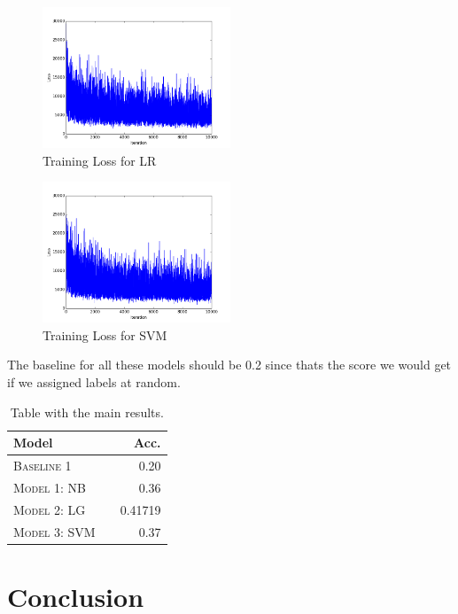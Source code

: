 \documentclass[11pt]{article}
\begin{document}
\begin{figure}
  \centering
  \includegraphics[width=0.5\textwidth]{lossLR}
  \caption{\label{fig:lLR} Training Loss for LR}
\end{figure}

\begin{figure}
  \centering
  \includegraphics[width=0.5\textwidth]{lossSVM}
  \caption{\label{fig:lSVM} Training Loss for SVM}
\end{figure}


The baseline for all these models should be 0.2 since thats the score we would
get if we assigned labels at random.

\begin{table}[h]
\centering
\begin{tabular}{llr}
 \toprule
 Model &  & Acc. \\
 \midrule
 \textsc{Baseline 1} & & 0.20\\
 \textsc{Model 1: NB} & & 0.36 \\
 \textsc{Model 2: LG} & & 0.41719 \\
 \textsc{Model 3: SVM} & & 0.37\\
 \bottomrule
\end{tabular}
\caption{\label{tab:results} Table with the main results.}
\end{table}

\section{Conclusion}
\end{document}
